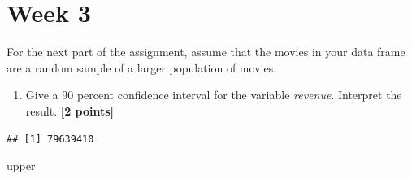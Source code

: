\documentclass[
]{article}
\newenvironment{Shaded}{\begin{snugshade}}{\end{snugshade}}
\newcommand{\AttributeTok}[1]{\textcolor[rgb]{0.13,0.29,0.53}{#1}}
\newcommand{\CommentTok}[1]{\textcolor[rgb]{0.56,0.35,0.01}{\textit{#1}}}
\newcommand{\DecValTok}[1]{\textcolor[rgb]{0.00,0.00,0.81}{#1}}
\newcommand{\FloatTok}[1]{\textcolor[rgb]{0.00,0.00,0.81}{#1}}
\newcommand{\FunctionTok}[1]{\textcolor[rgb]{0.13,0.29,0.53}{\textbf{#1}}}
\newcommand{\NormalTok}[1]{#1}
\newcommand{\OtherTok}[1]{\textcolor[rgb]{0.56,0.35,0.01}{#1}}
\newcommand{\SpecialCharTok}[1]{\textcolor[rgb]{0.81,0.36,0.00}{\textbf{#1}}}
\providecommand{\tightlist}{%
  \setlength{\itemsep}{0pt}\setlength{\parskip}{0pt}}
\begin{document}
\section{Week 3}\label{week-3}

For the next part of the assignment, assume that the movies in your data
frame are a random sample of a larger population of movies.

\begin{enumerate}
\def\labelenumi{\arabic{enumi}.}
\tightlist
\item
  Give a 90 percent confidence interval for the variable \emph{revenue}.
  Interpret the result. \textbf{[2 points]}
\end{enumerate}

\begin{Shaded}
\end{Shaded}

\begin{verbatim}
## [1] 79639410
\end{verbatim}

\begin{Shaded}
\begin{Highlighting}[]
\NormalTok{upper}
\end{Highlighting}
\end{Shaded}
\end{document}
